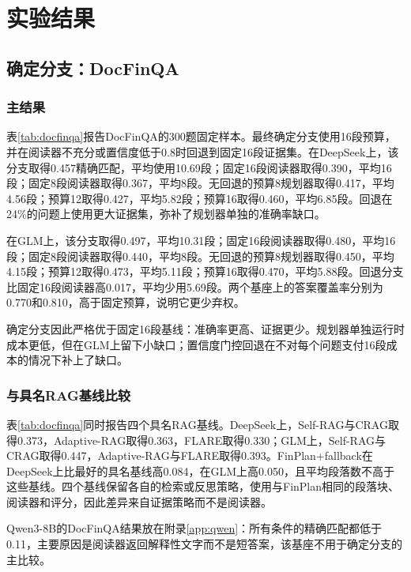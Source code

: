 \chapter{实验结果}
\label{ch:results}

\section{确定分支：DocFinQA}

\subsection{主结果}

表\ref{tab:docfinqa}报告DocFinQA的300题固定样本。最终确定分支使用16段预算，并在阅读器不充分或置信度低于0.8时回退到固定16段证据集。在DeepSeek上，该分支取得0.457精确匹配，平均使用10.69段；固定16段阅读器取得0.390，平均16段；固定8段阅读器取得0.367，平均8段。无回退的预算8规划器取得0.417，平均4.56段；预算12取得0.427，平均5.82段；预算16取得0.460，平均6.85段。回退在24\%的问题上使用更大证据集，弥补了规划器单独的准确率缺口。

在GLM上，该分支取得0.497，平均10.31段；固定16段阅读器取得0.480，平均16段；固定8段阅读器取得0.440，平均8段。无回退的预算8规划器取得0.450，平均4.15段；预算12取得0.473，平均5.11段；预算16取得0.470，平均5.88段。回退分支比固定16段阅读器高0.017，平均少用5.69段。两个基座上的答案覆盖率分别为0.770和0.810，高于固定预算，说明它更少弃权。

确定分支因此严格优于固定16段基线：准确率更高、证据更少。规划器单独运行时成本更低，但在GLM上留下小缺口；置信度门控回退在不对每个问题支付16段成本的情况下补上了缺口。

\subsection{与具名RAG基线比较}

表\ref{tab:docfinqa}同时报告四个具名RAG基线。DeepSeek上，Self-RAG与CRAG取得0.373，Adaptive-RAG取得0.363，FLARE取得0.330；GLM上，Self-RAG与CRAG取得0.447，Adaptive-RAG与FLARE取得0.393。FinPlan+fallback在DeepSeek上比最好的具名基线高0.084，在GLM上高0.050，且平均段落数不高于这些基线。四个基线保留各自的检索或反思策略，使用与FinPlan相同的段落块、阅读器和评分，因此差异来自证据策略而不是阅读器。

Qwen3-8B的DocFinQA结果放在附录\ref{app:qwen}：所有条件的精确匹配都低于0.11，主要原因是阅读器返回解释性文字而不是短答案，该基座不用于确定分支的主比较。

